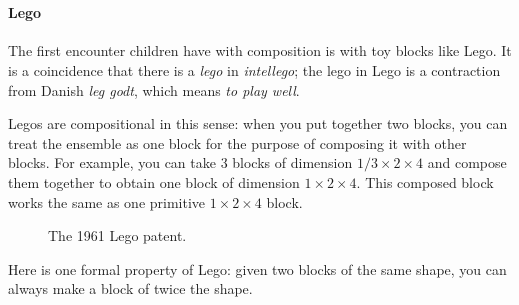 

\section{}

\paragraph{Lego}

The first encounter children have with composition is with toy blocks like Lego. It is a coincidence that there is a \emph{lego} in \emph{intellego}; the lego in Lego is a contraction from Danish \emph{leg godt}, which means \emph{to play well}.

Legos are compositional in this sense: when you put together two blocks, you can treat the ensemble as one block for the purpose of composing it with other blocks. For example, you can take 3 blocks of dimension $1/3 \times 2 \times 4$ and compose them together to obtain one block of dimension $1 \times 2 \times 4$. This composed block works the same as one primitive  $1 \times 2 \times 4 $ block.

\hfill
{}
\hfill
{}
\hfill





\begin{figure}[p]
  \centering
%
  \caption{The 1961 Lego patent.}
\end{figure}
Here is one formal property of Lego: given two blocks of the same shape, you can always make a block of twice the shape.

